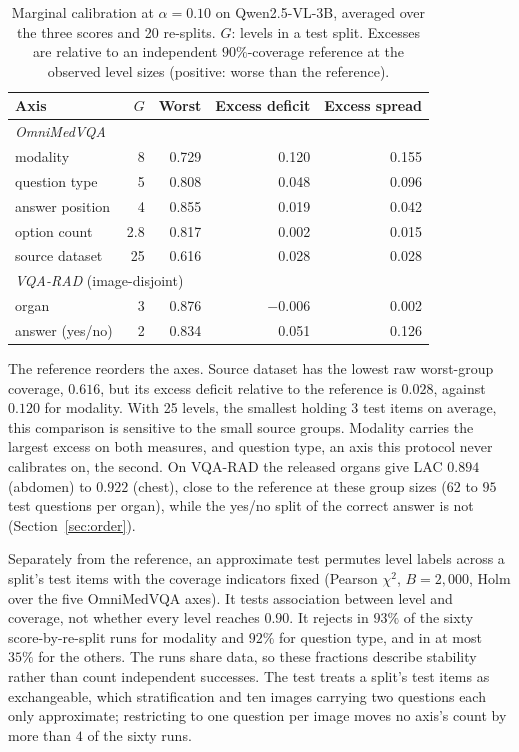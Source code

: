 \documentclass[a4paper,conference]{IEEEtran}
\newcommand{\rtag}[1]{}
\begin{document}
\begin{table}[tb]
\caption{Marginal calibration at $\alpha=0.10$ on Qwen2.5-VL-3B, averaged over
the three scores and 20 re-splits. $G$: levels in a test split. Excesses are
relative to an independent $90\%$-coverage reference at the observed level
sizes (positive: worse than the reference).}
\label{tab:axes}
\centering
\footnotesize
\begin{tabular}{lrrrr}
\toprule
Axis & $G$ & Worst & Excess deficit & Excess spread \\
\midrule
\multicolumn{5}{l}{\emph{OmniMedVQA}}\\
modality        & 8   & 0.729 & 0.120    & 0.155 \\
question type   & 5   & 0.808 & 0.048    & 0.096 \\
answer position & 4   & 0.855 & 0.019    & 0.042 \\
option count    & 2.8 & 0.817 & 0.002    & 0.015 \\
source dataset  & 25  & 0.616 & 0.028    & 0.028 \\
\midrule
\multicolumn{5}{l}{\emph{VQA-RAD} (image-disjoint)}\\
organ           & 3   & 0.876 & $-$0.006 & 0.002 \\
answer (yes/no) & 2   & 0.834 & 0.051    & 0.126 \\
\bottomrule
\end{tabular}
\end{table}

The reference reorders the axes. Source dataset has the lowest raw worst-group
coverage, $0.616$, but its excess deficit relative to the reference is
$0.028$, against $0.120$ for modality. With 25 levels, the smallest holding
$3$ test items on average, this comparison is sensitive to the small source
groups. Modality carries the largest excess on both measures, and question
type, an axis this protocol never calibrates on, the second. On VQA-RAD the
released organs give LAC $0.894$ (abdomen) to $0.922$ (chest), close to the
reference at these group sizes ($62$ to $95$ test questions per organ), while
the yes/no split of the correct answer is not (Section~\ref{sec:order}).

Separately from the reference, an approximate test permutes level labels across
a split's test items with the coverage indicators fixed (Pearson $\chi^2$,
$B=2{,}000$, Holm over the five OmniMedVQA axes). It tests association between
level and coverage, not whether every level reaches $0.90$.\rtag{R2.5} It rejects in
$93\%$ of the sixty score-by-re-split runs for modality and $92\%$ for question
type, and in at most $35\%$ for the others. The runs share data, so these
fractions describe stability rather than count independent successes. The test
treats a split's test items as exchangeable, which stratification and ten
images carrying two questions each only approximate; restricting to one
question per image moves no axis's count by more than $4$ of the sixty runs.
\end{document}
